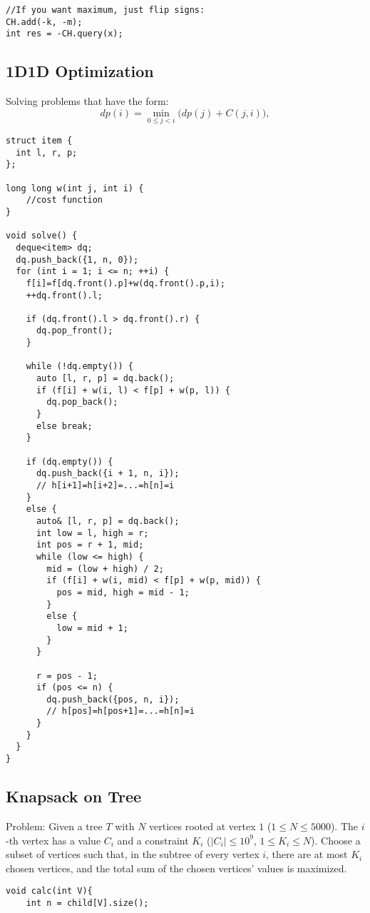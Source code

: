 \documentclass[11pt,a4paper]{article}
\begin{document}
\begin{multicols*}{2}
\begin{lstlisting}
//If you want maximum, just flip signs: 
CH.add(-k, -m);
int res = -CH.query(x);
\end{lstlisting}

\subsection{1D1D Optimization}
Solving problems that have the form: 
\[
dp(i) = \min_{0 \leq j < i} \Big( dp(j) + C(j, i) \Big),
\]
\begin{lstlisting}
struct item {
  int l, r, p;
};

long long w(int j, int i) {
    //cost function
}

void solve() {
  deque<item> dq;
  dq.push_back({1, n, 0});
  for (int i = 1; i <= n; ++i) {
    f[i]=f[dq.front().p]+w(dq.front().p,i);
    ++dq.front().l;

    if (dq.front().l > dq.front().r) {
      dq.pop_front();
    }

    while (!dq.empty()) {
      auto [l, r, p] = dq.back();
      if (f[i] + w(i, l) < f[p] + w(p, l)) {
        dq.pop_back();
      }
      else break;
    }

    if (dq.empty()) {
      dq.push_back({i + 1, n, i});
      // h[i+1]=h[i+2]=...=h[n]=i
    }
    else {
      auto& [l, r, p] = dq.back();
      int low = l, high = r;
      int pos = r + 1, mid;
      while (low <= high) {
        mid = (low + high) / 2;
        if (f[i] + w(i, mid) < f[p] + w(p, mid)) {
          pos = mid, high = mid - 1;
        }
        else {
          low = mid + 1;
        }
      }

      r = pos - 1;
      if (pos <= n) {
        dq.push_back({pos, n, i});
        // h[pos]=h[pos+1]=...=h[n]=i
      }
    }
  }
}
\end{lstlisting}


\subsection{Knapsack on Tree}
Problem: Given a tree $T$ with $N$ vertices rooted at vertex $1$ 
($1 \leq N \leq 5000$). 
The $i$-th vertex has a value $C_i$ and a constraint $K_i$ 
($|C_i| \leq 10^9$, $1 \leq K_i \leq N$). 
Choose a subset of vertices such that, in the subtree of every vertex $i$, 
there are at most $K_i$ chosen vertices, and the total sum of the chosen 
vertices' values is maximized.

\begin{lstlisting}
void calc(int V){
    int n = child[V].size();


\end{lstlisting}
\end{multicols*}
\end{document}
